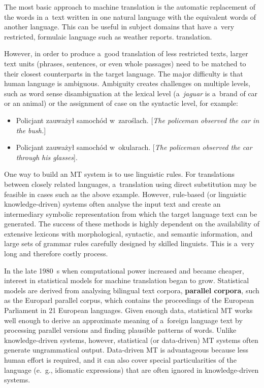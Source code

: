 \begin{multicols}{2}
The most basic approach to machine translation is the automatic
replacement of the words in a~text written in one natural language
with the equivalent words of another language. This can be useful in
subject domains that have a~very restricted, formulaic language such
as weather reports. 
translation.


However, in order to produce a~good translation of less restricted
texts, larger text units (phrases, sentences, or even whole passages)
need to be matched to their closest counterparts in the target
language. The major difficulty is that human language is ambiguous.
Ambiguity creates challenges on multiple levels, such as word sense
disambiguation at the lexical level (a~\textit{jaguar} is a~brand of
car or an animal) or the assignment of case on the syntactic level,
for example: 

\begin{itemize} \item Policjant zauważył samochód w~zaroślach.
[\textit{The policeman observed the car in the bush.}] \item Policjant
zauważył samochód w~okularach. [\textit{The policeman observed the
car through his glasses}]. \end{itemize} 

One way to build an MT system is to use linguistic rules. For
translations between closely related languages, a~translation using
direct substitution may be feasible in cases such as the above
example. However, rule-based (or linguistic knowledge-driven) systems
often analyse the input text and create an intermediary symbolic
representation from which the target language text can be generated.
The success of these methods is highly dependent on the availability
of extensive lexicons with morphological, syntactic, and semantic
information, and large sets of grammar rules carefully designed by
skilled linguists. This is a~very long and therefore costly process. 

In the late 1980~s when computational power increased and became
cheaper, interest in statistical models for machine translation began
to grow. Statistical models are derived from analysing bilingual text
corpora, \textbf{parallel corpora}, such as the Europarl parallel
corpus, which contains the proceedings of the European Parliament in
21 European languages. Given enough data, statistical MT works well
enough to derive an approximate meaning of a~foreign language text by
processing parallel versions and finding plausible patterns of words.
Unlike knowledge-driven systems, however, statistical (or data-driven)
MT systems often generate ungrammatical output. Data-driven MT is
advantageous because less human effort is required, and it can also
cover special particularities of the language (e.\, g., idiomatic
expressions) that are often ignored in knowledge-driven systems. 


\end{multicols}
